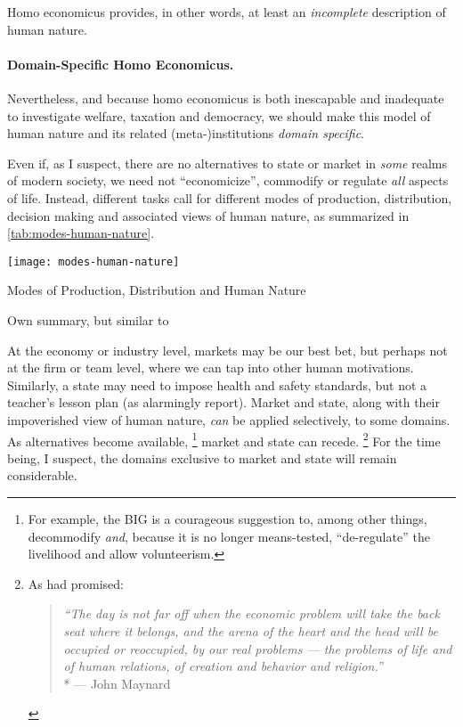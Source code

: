 {Homo economicus provides, in other words, at least an \emph{incomplete} description of human nature.

\paragraph{Domain-Specific Homo Economicus.}
Nevertheless, and because homo economicus is both inescapable and inadequate to investigate welfare, taxation and democracy, we should make this model of human nature and its related (meta-)institutions \emph{domain specific}.

Even if, as I suspect, there are no alternatives to state or market in \emph{some} realms of modern society, we need not ``economicize'', commodify or regulate \emph{all} aspects of life.
Instead, different tasks call for different modes of production, distribution, decision making and associated views of human nature, as summarized in \autoref{tab:modes-human-nature}.

\begin{table}[htbp]
	\centering
	\texttt{[image: modes-human-nature]}
	\caption{Modes of Production, Distribution and Human Nature}
	\label{tab:modes-human-nature}
	\scriptsize{Own summary, but similar to \citealt[52f.]{Schmitter1985}}
\end{table}%

At the economy or industry level, markets may be our best bet, but perhaps not at the firm or team level, where we can tap into other human motivations.
Similarly, a state may need to impose health and safety standards, but not a teacher's lesson plan (as \citeauthor{Schwartz2010} alarmingly report).
Market and state, along with their impoverished view of human nature, \emph{can} be applied selectively, to some domains.
As alternatives become available,
\footnote{
	For example, the \gls{BIG} is a courageous suggestion to, among other things, decommodify \emph{and}, because it is no longer means-tested, ``de-regulate'' the livelihood \citep[for example,][]{Offe2009} and allow volunteerism.
}
market and state can recede.
\footnote{
	As \citeauthor{Keynes} had promised:
	\begin{quote}
		\emph{``The day is not far off when the economic problem will take the back seat where it belongs, and the arena of the heart and the head will be occupied or reoccupied, by our real problems --- the problems of life and of human relations, of creation and behavior and religion.''}
		\\*
		--- John Maynard \cite{Keynes}
	\end{quote}
}
For the time being, I suspect, the domains exclusive to market and state will remain considerable.

}
